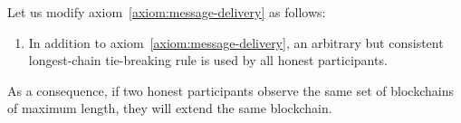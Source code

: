  Let us 
  modify axiom~\ref{axiom:message-delivery} as follows:

  \begin{enumerate}[label={\textbf{A\arabic*}\ensuremath{^\prime}}., ref={\textbf{A\arabic*}\ensuremath{^\prime}}, start=0]
  \item\label{axiom:tie-breaking} 
    In addition to axiom~\ref{axiom:message-delivery},  
    an arbitrary but consistent 
    longest-chain tie-breaking rule 
    is used by all honest participants.
  \end{enumerate}
  As a consequence, 
  if two honest participants observe 
  the same set of blockchains of maximum length, 
  they will extend the same blockchain.



